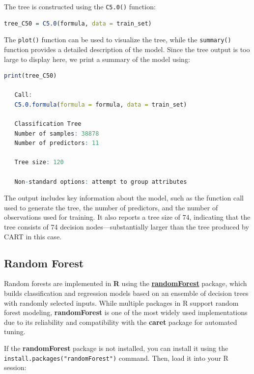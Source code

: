 \documentclass[
]{book}
\newcommand{\passthrough}[1]{#1}
\theoremstyle{definition}
\theoremstyle{definition}
\theoremstyle{definition}
\theoremstyle{definition}
\theoremstyle{remark}
\begin{document}
The tree is constructed using the \passthrough{\lstinline!C5.0()!} function:

\begin{lstlisting}[language=R]
tree_C50 = C5.0(formula, data = train_set) 
\end{lstlisting}

The \passthrough{\lstinline!plot()!} function can be used to visualize the tree, while the \passthrough{\lstinline!summary()!} function provides a detailed description of the model. Since the tree output is too large to display here, we print a summary of the model using:

\begin{lstlisting}[language=R]
print(tree_C50)
   
   Call:
   C5.0.formula(formula = formula, data = train_set)
   
   Classification Tree
   Number of samples: 38878 
   Number of predictors: 11 
   
   Tree size: 120 
   
   Non-standard options: attempt to group attributes
\end{lstlisting}

The output includes key information about the model, such as the function call used to generate the tree, the number of predictors, and the number of observations used for training. It also reports a tree size of 74, indicating that the tree consists of 74 decision nodes---substantially larger than the tree produced by CART in this case.

\subsection*{Random Forest}\label{random-forest}

Random forests are implemented in \textbf{R} using the \href{https://CRAN.R-project.org/package=randomForest}{\textbf{randomForest}} package, which builds classification and regression models based on an ensemble of decision trees with randomly selected inputs. While multiple packages in R support random forest modeling, \textbf{randomForest} is one of the most widely used implementations due to its reliability and compatibility with the \textbf{caret} package for automated tuning.

If the \textbf{randomForest} package is not installed, you can install it using the \passthrough{\lstinline!install.packages("randomForest")!} command. Then, load it into your R session:
\end{document}
